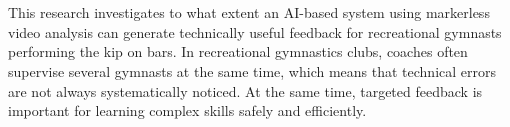 
%
%
%
%
%

%



\chapter*{}

This research investigates to what extent an AI-based system using markerless video analysis can generate technically useful feedback for recreational gymnasts performing the kip on bars. In recreational gymnastics clubs, coaches often supervise several gymnasts at the same time, which means that technical errors are not always systematically noticed. At the same time, targeted feedback is important for learning complex skills safely and efficiently.


